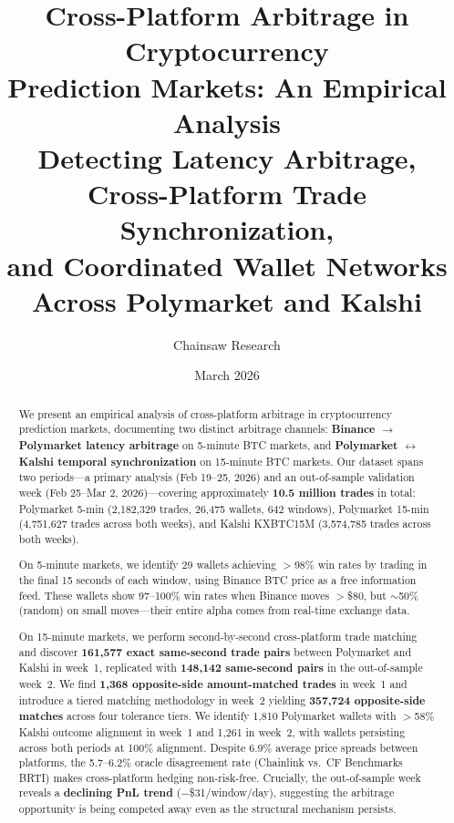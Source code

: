 \documentclass[11pt,a4paper]{article}
\title{
    \textbf{Cross-Platform Arbitrage in Cryptocurrency \\
    Prediction Markets: An Empirical Analysis} \\[0.5em]
    \large Detecting Latency Arbitrage, Cross-Platform Trade Synchronization, \\
    and Coordinated Wallet Networks Across Polymarket and Kalshi
}
\author{
    Chainsaw Research
}
\date{March 2026}
\begin{document}
\maketitle

\begin{abstract}
We present an empirical analysis of cross-platform arbitrage in cryptocurrency prediction markets, documenting two distinct arbitrage channels: \textbf{Binance $\to$ Polymarket latency arbitrage} on 5-minute BTC markets, and \textbf{Polymarket $\leftrightarrow$ Kalshi temporal synchronization} on 15-minute BTC markets. Our dataset spans two periods---a primary analysis (Feb 19--25, 2026) and an out-of-sample validation week (Feb 25--Mar 2, 2026)---covering approximately \textbf{10.5 million trades} in total: Polymarket 5-min (2,182,329 trades, 26,475 wallets, 642 windows), Polymarket 15-min (4,751,627 trades across both weeks), and Kalshi KXBTC15M (3,574,785 trades across both weeks).

On 5-minute markets, we identify 29 wallets achieving $>$98\% win rates by trading in the final 15 seconds of each window, using Binance BTC price as a free information feed. These wallets show 97--100\% win rates when Binance moves $>$\$80, but $\sim$50\% (random) on small moves---their entire alpha comes from real-time exchange data.

On 15-minute markets, we perform second-by-second cross-platform trade matching and discover \textbf{161,577 exact same-second trade pairs} between Polymarket and Kalshi in week~1, replicated with \textbf{148,142 same-second pairs} in the out-of-sample week~2. We find \textbf{1,368 opposite-side amount-matched trades} in week~1 and introduce a tiered matching methodology in week~2 yielding \textbf{357,724 opposite-side matches} across four tolerance tiers. We identify 1,810 Polymarket wallets with $>$58\% Kalshi outcome alignment in week~1 and 1,261 in week~2, with wallets persisting across both periods at 100\% alignment. Despite 6.9\% average price spreads between platforms, the 5.7--6.2\% oracle disagreement rate (Chainlink vs.\ CF Benchmarks BRTI) makes cross-platform hedging non-risk-free. Crucially, the out-of-sample week reveals a \textbf{declining PnL trend} ($-$\$31/window/day), suggesting the arbitrage opportunity is being competed away even as the structural mechanism persists.
\end{abstract}
\end{document}
